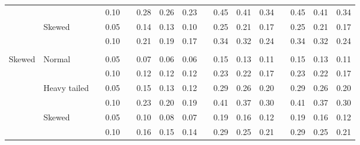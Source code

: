 \documentclass{article} %
\begin{document}
\begin{table}[ht]
\begin{scriptsize}
\begin{center}
\begin{tabular}{ll p{.1cm} c p{.1cm} rrr p{.1cm} rrr p{.1cm} rrr}
             &              && 0.10 &&   0.28 & 0.26 & 0.23 && 0.45 & 0.41 & 0.34 && 0.45 & 0.41 & 0.34 \\ 
             & Skewed       && 0.05 &&   0.14 & 0.13 & 0.10 && 0.25 & 0.21 & 0.17 && 0.25 & 0.21 & 0.17 \\ 
             &              && 0.10 &&   0.21 & 0.19 & 0.17 && 0.34 & 0.32 & 0.24 && 0.34 & 0.32 & 0.24 \\ 
             &&&&&&&&&&&&&&&\\
Skewed       & Normal       && 0.05 &&   0.07 & 0.06 & 0.06 && 0.15 & 0.13 & 0.11 && 0.15 & 0.13 & 0.11 \\ 
             &              && 0.10 &&   0.12 & 0.12 & 0.12 && 0.23 & 0.22 & 0.17 && 0.23 & 0.22 & 0.17 \\ 
             & Heavy tailed && 0.05 &&   0.15 & 0.13 & 0.12 && 0.29 & 0.26 & 0.20 && 0.29 & 0.26 & 0.20 \\ 
             &              && 0.10 &&   0.23 & 0.20 & 0.19 && 0.41 & 0.37 & 0.30 && 0.41 & 0.37 & 0.30 \\ 
             & Skewed       && 0.05 &&   0.10 & 0.08 & 0.07 && 0.19 & 0.16 & 0.12 && 0.19 & 0.16 & 0.12 \\ 
             &              && 0.10 &&   0.16 & 0.15 & 0.14 && 0.29 & 0.25 & 0.21 && 0.29 & 0.25 & 0.21 \\ 



\end{tabular}
\end{center}
\end{scriptsize}
\end{table}
\end{document}
